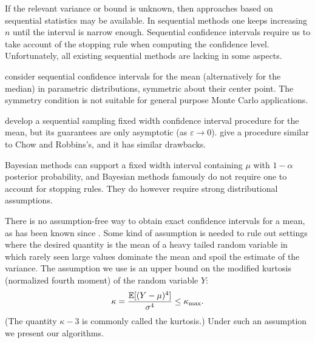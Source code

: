 \documentclass{iitthesis}
\begin{document}
If the relevant variance or bound is unknown, then approaches based on sequential statistics \cite{Siegmund85} may be available.  In sequential methods one keeps increasing $n$ until the interval is narrow enough. Sequential confidence intervals require us to take account of the stopping rule when computing the confidence level. Unfortunately, all existing sequential methods are lacking in some aspects. 

\cite{SerflingaWackerlyb76} consider sequential confidence intervals for the mean (alternatively for the median) in parametric distributions, symmetric about their center point. The symmetry condition is not suitable for general
purpose Monte Carlo applications.

\cite{ChowRobbins65} develop a sequential sampling fixed width confidence interval procedure for the mean, but its guarantees are only asymptotic (as $\varepsilon \to 0$). \cite{MukhDatta96} give a procedure similar to Chow and Robbins's, and it has similar drawbacks.

Bayesian methods can support a fixed width interval containing $\mu$ with $1-\alpha$ posterior probability, and
Bayesian methods famously do not require one to account for stopping rules. They do however require strong distributional assumptions.

There is no assumption-free way to obtain exact confidence intervals for a mean, as has been known since \cite{BahadurSavage56}. Some kind of assumption is needed to rule out settings where the desired quantity is the mean of a heavy tailed random variable in which rarely seen large values dominate the mean and spoil the estimate of the variance. The assumption we use is an upper bound on the modified kurtosis (normalized fourth moment) of the random variable $Y$:
\begin{equation} \label{def:boundedkurtosis}
\kappa = \frac{\mathbb{E}[(Y-\mu)^4]}{\sigma^4} \le \kappa_{\max}.
\end{equation}
(The quantity $\kappa-3$ is commonly called the kurtosis.)  Under such an assumption we present our algorithms.
\end{document}
